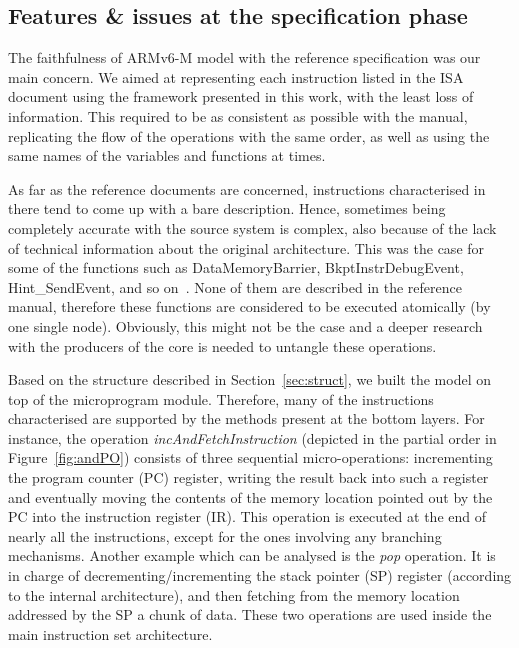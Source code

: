 \documentclass[conference]{IEEEtran}
\begin{document}
\subsection{Features \& issues at the specification phase}
\label{sec:feat}
The faithfulness of ARMv6-M model with the reference specification was our main concern.
We aimed at representing each instruction listed in the ISA document using the
framework presented in this work, with the least loss of information. This required to be
as consistent as possible with the manual, replicating the flow of the operations with
the same order, as well as using the same names of the variables and functions at times.

As far as the reference documents are concerned, instructions characterised in there tend to
come up with a bare description. Hence, sometimes being completely accurate with 
the source system is complex, also because of the lack of technical information about the
original architecture. This was the case for some of the functions such as DataMemoryBarrier,
BkptInstrDebugEvent, Hint\_SendEvent, and so on~\cite{armManual}.
None of them are described in the reference manual, therefore these
functions are considered to be executed atomically (by one single node). Obviously, this
might not be the case and a deeper research with the producers of the core is needed to
untangle these operations.

Based on the structure described in Section~\ref{sec:struct}, we built the model on top of
the microprogram module. Therefore, many of the instructions characterised are supported by
the methods present at the bottom layers. For instance, the operation
\textit{incAndFetchInstruction} (depicted in the partial order in Figure~\ref{fig:andPO})
consists of three sequential micro-operations: incrementing the program counter (PC)
register, writing the result back into such a register and eventually moving the contents of
the memory location pointed out by the PC into the instruction register (IR). This operation is
executed at the end of nearly all the instructions, except for the ones involving any branching
mechanisms. Another example which can be analysed is the \textit{pop} operation. It is in charge of
decrementing/incrementing the stack pointer (SP) register (according to the internal
architecture), and then fetching from the memory location addressed by the SP a chunk of 
data. These two operations are used inside the main instruction set architecture.
\end{document}
